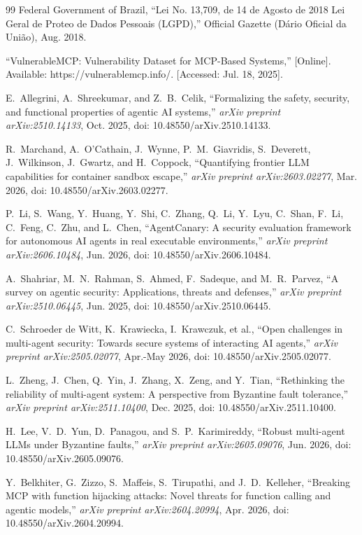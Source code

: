 \documentclass[12pt,twocolumn,journal]{IEEEtran}
\begin{document}
\begin{thebibliography}{99}
Federal Government of Brazil, ``Lei No. 13,709, de 14 de Agosto de 2018 Lei Geral de Proteo de Dados Pessoais (LGPD),'' Official Gazette (Dário Oficial da União), Aug. 2018.

``VulnerableMCP: Vulnerability Dataset for MCP-Based Systems,'' [Online]. Available: https://vulnerablemcp.info/. [Accessed: Jul. 18, 2025].

E.~Allegrini, A.~Shreekumar, and Z.~B.~Celik, ``Formalizing the safety, security, and functional properties of agentic AI systems,'' \emph{arXiv preprint arXiv:2510.14133}, Oct. 2025, doi: 10.48550/arXiv.2510.14133.

R.~Marchand, A.~O'Cathain, J.~Wynne, P.~M.~Giavridis, S.~Deverett, J.~Wilkinson, J.~Gwartz, and H.~Coppock, ``Quantifying frontier LLM capabilities for container sandbox escape,'' \emph{arXiv preprint arXiv:2603.02277}, Mar. 2026, doi: 10.48550/arXiv.2603.02277.

P.~Li, S.~Wang, Y.~Huang, Y.~Shi, C.~Zhang, Q.~Li, Y.~Lyu, C.~Shan, F.~Li, C.~Feng, C.~Zhu, and L.~Chen, ``AgentCanary: A security evaluation framework for autonomous AI agents in real executable environments,'' \emph{arXiv preprint arXiv:2606.10484}, Jun. 2026, doi: 10.48550/arXiv.2606.10484.

A.~Shahriar, M.~N.~Rahman, S.~Ahmed, F.~Sadeque, and M.~R.~Parvez, ``A survey on agentic security: Applications, threats and defenses,'' \emph{arXiv preprint arXiv:2510.06445}, Jun. 2025, doi: 10.48550/arXiv.2510.06445.

C.~Schroeder de Witt, K.~Krawiecka, I.~Krawczuk, et al., ``Open challenges in multi-agent security: Towards secure systems of interacting AI agents,'' \emph{arXiv preprint arXiv:2505.02077}, Apr.-May 2026, doi: 10.48550/arXiv.2505.02077.

L.~Zheng, J.~Chen, Q.~Yin, J.~Zhang, X.~Zeng, and Y.~Tian, ``Rethinking the reliability of multi-agent system: A perspective from Byzantine fault tolerance,'' \emph{arXiv preprint arXiv:2511.10400}, Dec. 2025, doi: 10.48550/arXiv.2511.10400.

H.~Lee, V.~D.~Yun, D.~Panagou, and S.~P.~Karimireddy, ``Robust multi-agent LLMs under Byzantine faults,'' \emph{arXiv preprint arXiv:2605.09076}, Jun. 2026, doi: 10.48550/arXiv.2605.09076.

Y.~Belkhiter, G.~Zizzo, S.~Maffeis, S.~Tirupathi, and J.~D.~Kelleher, ``Breaking MCP with function hijacking attacks: Novel threats for function calling and agentic models,'' \emph{arXiv preprint arXiv:2604.20994}, Apr. 2026, doi: 10.48550/arXiv.2604.20994.


\end{thebibliography}
\end{document}
